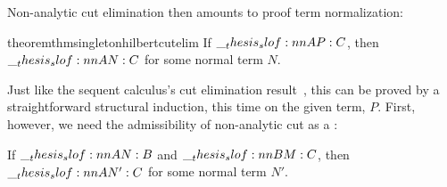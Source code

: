 Non-analytic cut elimination then amounts to proof term normalization:
%
\begin{restatable*}[
  name = Non-analytic cut elimination,
  label = thm:singleton:hilbert:cutelim
]{theorem}{thmsingletonhilbertcutelim}
  If $\slof{A |- P : C}$, then $\slof{A |- N : C}$ for some normal term $N$.
\end{restatable*}
%
Just like the sequent calculus's cut elimination result~, this  can be proved by a straightforward structural induction, this time on the given term, $P$.
First, however, we need the admissibility of non-analytic cut as a :
%
\begin{lemma}\label{lem:singleton-logic:hilbert:cut-admissibility}
  If $\slof{A |- N : B}$ and $\slof{B |- M : C}$, then $\slof{A |- N' : C}$ for some normal term $N'$.
\end{lemma}
%
